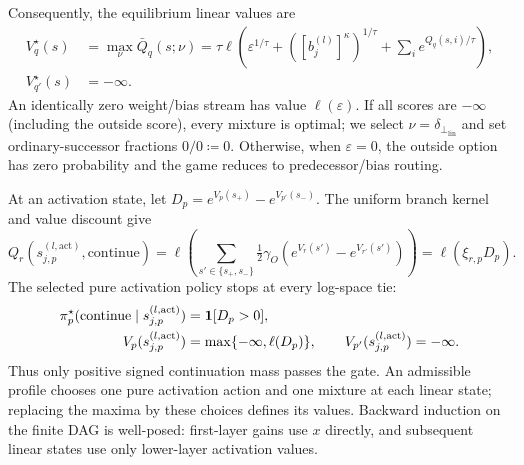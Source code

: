 \begin{definition}
Consequently, the equilibrium linear values are
\begin{align}\label{ptnb:eq:routing-linear-value}
 V_q^\star(s)&=\max_\nu\bar Q_q(s;\nu)
 =\tau\ell\!\left(\varepsilon^{1/\tau}+([b_j^{(l)}]^\kappa)^{1/\tau}+\sum_i e^{Q_q(s,i)/\tau}\right),\nonumber\\
 V_{q'}^\star(s)&=-\infty.
\end{align}
An identically zero weight/bias stream has value $\ell(\varepsilon)$. If all scores are $-\infty$ (including the outside score), every mixture is optimal; we select $\nu=\delta_{\perp_{\mathrm{lin}}}$ and set ordinary-successor fractions $0/0\coloneqq0$. Otherwise, when $\varepsilon=0$, the outside option has zero probability and the game reduces to predecessor/bias routing.

At an activation state, let $D_p=e^{V_p(s_+)}-e^{V_{p'}(s_-)}$. The uniform branch kernel and value discount give
\begin{equation}\label{ptnb:eq:routing-activation-continue}
 Q_r(s_{j,p}^{(l,\mathrm{act})},\mathrm{continue})
 =\ell\!\left(\sum_{s'\in\{s_+,s_-\}}\tfrac12\gamma_O
       (e^{V_r(s')}-e^{V_{r'}(s')})\right)=\ell(\xi_{r,p}D_p).
\end{equation}
The selected pure activation policy stops at every log-space tie:
\begin{align}\label{ptnb:eq:routing-activation-value}
 \pi_p^\star(\mathrm{continue}\mid s_{j,p}^{(l,\mathrm{act})})&=\mathbf{1}[D_p>0],\nonumber\\
 V_p(s_{j,p}^{(l,\mathrm{act})})&=\max\{-\infty,\ell(D_p)\},
 \qquad V_{p'}(s_{j,p}^{(l,\mathrm{act})})=-\infty.
\end{align}
Thus only positive signed continuation mass passes the gate. An admissible profile chooses one pure activation action and one mixture at each linear state; replacing the maxima by these choices defines its values. Backward induction on the finite DAG is well-posed: first-layer gains use $x$ directly, and subsequent linear states use only lower-layer activation values.
\end{definition}

